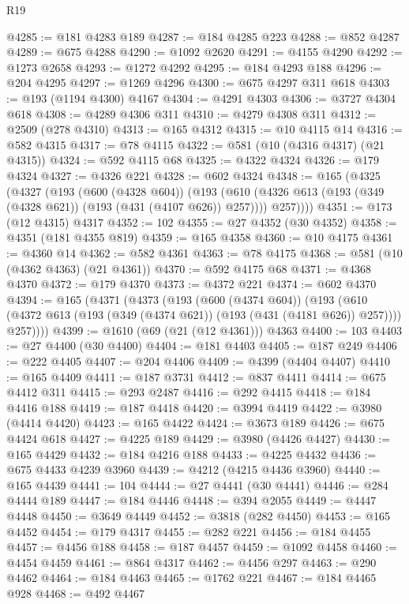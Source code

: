 \begin{lexlean}{R19}
\begin{coremodule}
@4285 := @181 @4283 @189
@4287 := @184 @4285 @223
@4288 := @852 @4287
@4289 := @675 @4288
@4290 := @1092 @2620
@4291 := @4155 @4290
@4292 := @1273 @2658
@4293 := @1272 @4292
@4295 := @184 @4293 @188
@4296 := @204 @4295
@4297 := @1269 @4296
@4300 := @675 @4297 @311 @618
@4303 := @193 (@1194 @4300) @4167
@4304 := @4291 @4303
@4306 := @3727 @4304 @618
@4308 := @4289 @4306 @311
@4310 := @4279 @4308 @311
@4312 := @2509 (@278 @4310)
@4313 := @165 @4312
@4315 := @10 @4115 @14
@4316 := @582 @4315
@4317 := @78 @4115
@4322 := @581 (@10 (@4316 @4317) (@21 @4315))
@4324 := @592 @4115 @68
@4325 := @4322 @4324
@4326 := @179 @4324
@4327 := @4326 @221
@4328 := @602 @4324
@4348 := @165
    (@4325
      (@4327
        (@193
          (@600 (@4328 @604))
          (@193
            (@610 (@4326 @613 (@193 (@349 (@4328 @621)) (@193 (@431 (@4107 @626)) @257))))
            @257))))
@4351 := @173 (@12 @4315) @4317
@4352 := 102
@4355 := @27 @4352 (@30 @4352)
@4358 := @4351 (@181 @4355 @819)
@4359 := @165 @4358
@4360 := @10 @4175
@4361 := @4360 @14
@4362 := @582 @4361
@4363 := @78 @4175
@4368 := @581 (@10 (@4362 @4363) (@21 @4361))
@4370 := @592 @4175 @68
@4371 := @4368 @4370
@4372 := @179 @4370
@4373 := @4372 @221
@4374 := @602 @4370
@4394 := @165
    (@4371
      (@4373
        (@193
          (@600 (@4374 @604))
          (@193
            (@610 (@4372 @613 (@193 (@349 (@4374 @621)) (@193 (@431 (@4181 @626)) @257))))
            @257))))
@4399 := @1610 (@69 (@21 (@12 @4361))) @4363
@4400 := 103
@4403 := @27 @4400 (@30 @4400)
@4404 := @181 @4403
@4405 := @187 @249
@4406 := @222 @4405
@4407 := @204 @4406
@4409 := @4399 (@4404 @4407)
@4410 := @165 @4409
@4411 := @187 @3731
@4412 := @837 @4411
@4414 := @675 @4412 @311
@4415 := @293 @2487
@4416 := @292 @4415
@4418 := @184 @4416 @188
@4419 := @187 @4418
@4420 := @3994 @4419
@4422 := @3980 (@4414 @4420)
@4423 := @165 @4422
@4424 := @3673 @189
@4426 := @675 @4424 @618
@4427 := @4225 @189
@4429 := @3980 (@4426 @4427)
@4430 := @165 @4429
@4432 := @184 @4216 @188
@4433 := @4225 @4432
@4436 := @675 @4433 @4239 @3960
@4439 := @4212 (@4215 @4436 @3960)
@4440 := @165 @4439
@4441 := 104
@4444 := @27 @4441 (@30 @4441)
@4446 := @284 @4444 @189
@4447 := @184 @4446
@4448 := @394 @2055
@4449 := @4447 @4448
@4450 := @3649 @4449
@4452 := @3818 (@282 @4450)
@4453 := @165 @4452
@4454 := @179 @4317
@4455 := @282 @221
@4456 := @184 @4455
@4457 := @4456 @188
@4458 := @187 @4457
@4459 := @1092 @4458
@4460 := @4454 @4459
@4461 := @864 @4317
@4462 := @4456 @297
@4463 := @290 @4462
@4464 := @184 @4463
@4465 := @1762 @221
@4467 := @184 @4465 @928
@4468 := @492 @4467

\end{coremodule}
\end{lexlean}
